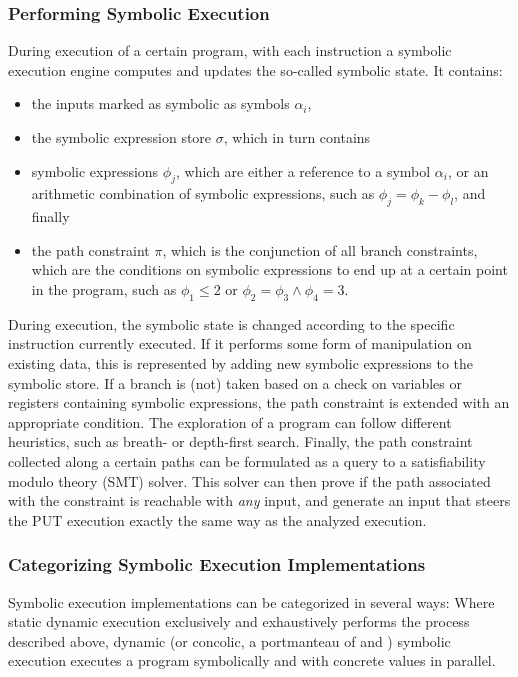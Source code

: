\documentclass{article}
\begin{document}
\begin{multicols}{2}
    \subsubsection{Performing Symbolic Execution}
    During execution of a certain program, with each instruction a symbolic execution engine computes and updates the so-called symbolic state. It contains:
    \begin{itemize}
        \item the inputs marked as symbolic as symbols $\alpha_i$,
        \item the symbolic expression store $\sigma$, which in turn contains
        \item symbolic expressions $\phi_j$, which are either a reference to a symbol $\alpha_i$, or an arithmetic combination of symbolic expressions, such as $\phi_j=\phi_k-\phi_l$, and finally
        \item the path constraint $\pi$, which is the conjunction of all branch constraints, which are the conditions on symbolic expressions to end up at a certain point in the program, such as $\phi_1\leq2$ or $\phi_2=\phi_3\land\phi_4=3$.
    \end{itemize}

    During execution, the symbolic state is changed according to the specific instruction currently executed. If it performs some form of manipulation on existing data, this is represented by adding new symbolic expressions to the symbolic store. If a branch is (not) taken based on a check on variables or registers containing symbolic expressions, the path constraint is extended with an appropriate condition. The exploration of a program can follow different heuristics, such as breath- or depth-first search. Finally, the path constraint collected along a certain paths can be formulated as a query to a satisfiability modulo theory (SMT) solver. This solver can then prove if the path associated with the constraint is reachable with \textit{any} input, and generate an input that steers the PUT execution exactly the same way as the analyzed execution.

    \subsubsection{Categorizing Symbolic Execution Implementations}
    Symbolic execution implementations can be categorized in several ways: Where static dynamic execution exclusively and exhaustively performs the process described above, dynamic (or concolic, a portmanteau of  and ) symbolic execution executes a program symbolically and with concrete values in parallel.


\end{multicols}
\end{document}
